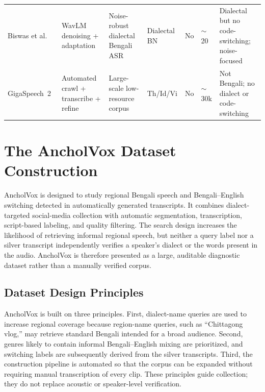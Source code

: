 \documentclass[journal]{IEEEtran}
\begin{document}
\begin{table}[t]
\begin{tabular}{@{}p{2.5cm}p{2.6cm}p{2.6cm}p{1.7cm}cp{1.0cm}p{3.4cm}@{}}
Biswas et al.~\cite{biswas2025unified} & WavLM denoising + adaptation & Noise-robust dialectal Bengali ASR & Dialectal BN & No & $\sim$20 & Dialectal but no code-switching; noise-focused \\
GigaSpeech~2~\cite{yang2025gigaspeech2} & Automated crawl + transcribe + refine & Large-scale low-resource corpus & Th/Id/Vi & No & $\sim$30k & Not Bengali; no dialect or code-switching \\
\midrule
\bottomrule
\end{tabular}
\end{table}

\section{The AncholVox Dataset Construction}
\label{sec:dataset}
AncholVox is designed to study regional Bengali speech and Bengali--English
switching detected in automatically generated transcripts. It combines
dialect-targeted social-media collection with automatic segmentation,
transcription, script-based labeling, and quality filtering. The search design
increases the likelihood of retrieving informal regional speech, but neither a
query label nor a silver transcript independently verifies a speaker's dialect
or the words present in the audio. AncholVox is therefore presented as a large,
auditable diagnostic dataset rather than a manually verified corpus.


\subsection{Dataset Design Principles}
AncholVox is built on three principles. First, dialect-name queries are used to
increase regional coverage because region-name queries, such as ``Chittagong
vlog,'' may retrieve standard Bengali intended for a broad audience. Second,
genres likely to contain informal Bengali--English mixing are prioritized, and
switching labels are subsequently derived from the silver transcripts. Third,
the construction pipeline is automated so that the corpus can be expanded
without requiring manual transcription of every clip. These principles guide
collection; they do not replace acoustic or speaker-level verification.
\end{document}
